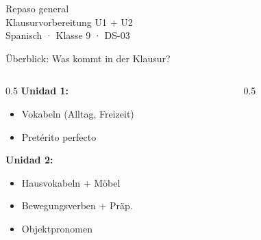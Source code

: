 \documentclass[aspectratio=169, 11pt]{beamer}
\begin{document}

{
\begin{frame}[plain]
    \vfill
    \begin{center}
        {Repaso general}\\[8pt]
        {Klausurvorbereitung U1 + U2}\\[20pt]
        {\small Spanisch · Klasse 9 · DS-03}
    \end{center}
    \vfill
\end{frame}
}


\begin{frame}{Überblick: Was kommt in der Klausur?}
    \begin{columns}
        \begin{column}{0.5\textwidth}
            \textbf{Unidad 1:}
            \begin{itemize}
                \item Vokabeln (Alltag, Freizeit)
                \item Pretérito perfecto
            \end{itemize}

            \vspace{10pt}

            \textbf{Unidad 2:}
            \begin{itemize}
                \item Hausvokabeln + Möbel
                \item Bewegungsverben + Präp.
                \item Objektpronomen
            \end{itemize}
        \end{column}
        \begin{column}{0.5\textwidth}
            \begin{center}
            \end{center}
        \end{column}
    \end{columns}
\end{frame}
\end{document}
